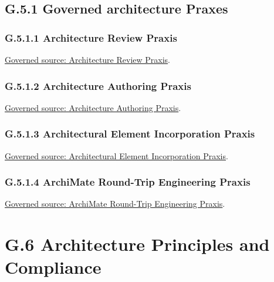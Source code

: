 \subsection*{G.5.1 Governed architecture Praxes}
\label{navigation:G.5.1}

\subsubsection*{G.5.1.1 Architecture Review Praxis}
\label{navigation:G.5.1.1}

\href{../../../../governance/architecture-review-praxis.md}{Governed source: Architecture Review Praxis}.\par
\subsubsection*{G.5.1.2 Architecture Authoring Praxis}
\label{navigation:G.5.1.2}

\href{../../../../governance/architecture-authoring-praxis.md}{Governed source: Architecture Authoring Praxis}.\par
\subsubsection*{G.5.1.3 Architectural Element Incorporation Praxis}
\label{navigation:G.5.1.3}

\href{../../../../governance/continuum-incorporation-praxis.md}{Governed source: Architectural Element Incorporation Praxis}.\par
\subsubsection*{G.5.1.4 ArchiMate Round-Trip Engineering Praxis}
\label{navigation:G.5.1.4}

\href{../../../../governance/archimate-round-trip-engineering-praxis.md}{Governed source: ArchiMate Round-Trip Engineering Praxis}.\par
\section*{G.6 Architecture Principles and Compliance}
\label{navigation:G.6}

